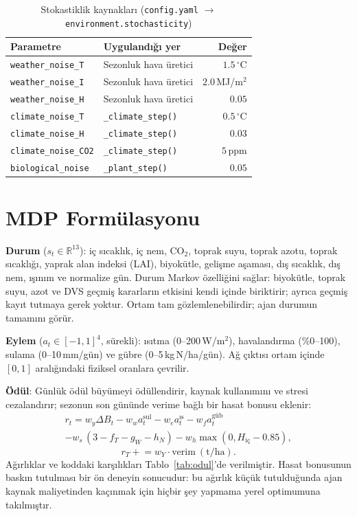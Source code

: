 \documentclass[conference,a4paper]{IEEEtran}
\newcommand{\cfg}[1]{\texttt{#1}}
\begin{document}
\begin{table}[!t]
\caption{Stokastiklik kaynakları (\cfg{config.yaml} $\rightarrow$ \cfg{environment.stochasticity})}
\label{tab:stok}
\centering
\footnotesize
\begin{tabular}{@{}llr@{}}
\toprule
Parametre & Uygulandığı yer & Değer\\
\midrule
\cfg{weather\_noise\_T} & Sezonluk hava üretici & $1.5\,^{\circ}$C\\
\cfg{weather\_noise\_I} & Sezonluk hava üretici & $2.0$\,MJ/m$^2$\\
\cfg{weather\_noise\_H} & Sezonluk hava üretici & $0.05$\\
\cfg{climate\_noise\_T} & \cfg{\_climate\_step()} & $0.5\,^{\circ}$C\\
\cfg{climate\_noise\_H} & \cfg{\_climate\_step()} & $0.03$\\
\cfg{climate\_noise\_CO2} & \cfg{\_climate\_step()} & $5$\,ppm\\
\cfg{biological\_noise} & \cfg{\_plant\_step()} & $0.05$\\
\bottomrule
\end{tabular}
\end{table}

\section{MDP Formülasyonu}
\label{sec:mdp}

\textbf{Durum} ($s_t\in\mathbb{R}^{13}$): iç sıcaklık, iç nem, CO$_2$, toprak suyu, toprak azotu, toprak sıcaklığı, yaprak alan indeksi (LAI), biyokütle, gelişme aşaması, dış sıcaklık, dış nem, ışınım ve normalize gün. Durum Markov özelliğini sağlar: biyokütle, toprak suyu, azot ve DVS geçmiş kararların etkisini kendi içinde biriktirir; ayrıca geçmiş kayıt tutmaya gerek yoktur. Ortam tam gözlemlenebilirdir; ajan durumun tamamını görür.

\textbf{Eylem} ($a_t\in[-1,1]^4$, sürekli): ısıtma (0--200\,W/m$^2$), havalandırma (\%0--100), sulama (0--10\,mm/gün) ve gübre (0--5\,kg\,N/ha/gün). Ağ çıktısı ortam içinde $[0,1]$ aralığındaki fiziksel oranlara çevrilir.

\textbf{Ödül}: Günlük ödül büyümeyi ödüllendirir, kaynak kullanımını ve stresi cezalandırır; sezonun son gününde verime bağlı bir hasat bonusu eklenir:
\begin{multline}
r_t = w_y\Delta B_t - w_w a^{\mathrm{sul}}_t - w_e a^{\text{ıs}}_t - w_f a^{\text{güb}}_t\\
 - w_s\,(3-f_T-g_W-h_N) - w_h\max(0,H_{\text{iç}}-0.85),
\end{multline}
\begin{equation}
r_T \mathrel{+}= w_Y\cdot\mathrm{verim}\ (\mathrm{t/ha}).
\end{equation}
Ağırlıklar ve koddaki karşılıkları Tablo~\ref{tab:odul}'de verilmiştir. Hasat bonusunun baskın tutulması bir ön deneyin sonucudur: bu ağırlık küçük tutulduğunda ajan kaynak maliyetinden kaçınmak için hiçbir şey yapmama yerel optimumuna takılmıştır.
\end{document}
